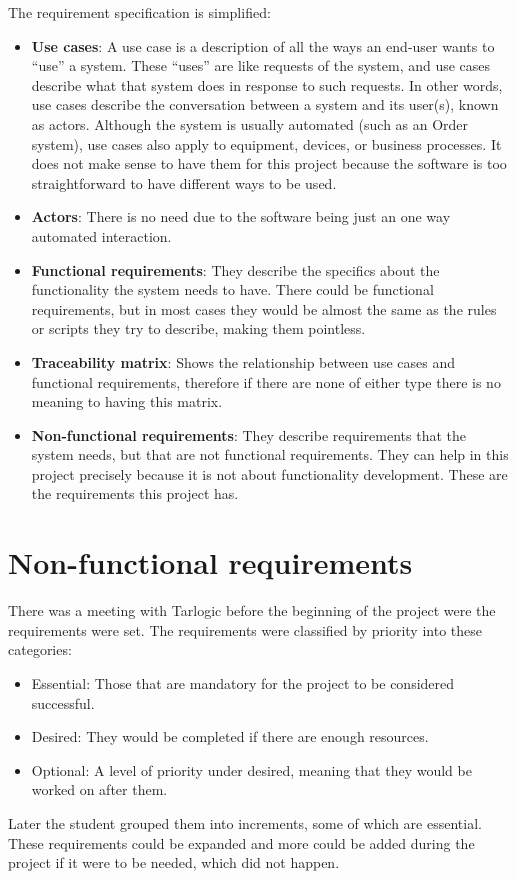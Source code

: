 \linej
\linej
The requirement specification is simplified:
\begin{itemize}
	\item \textbf{Use cases}: A use case is a description of all the ways an end-user wants to ``use'' a system. These ``uses'' are like requests of the system, and use cases describe what that system does in response to such requests. In other words, use cases describe the conversation between a system and its user(s), known as actors. Although the system is usually automated (such as an Order system), use cases also apply to equipment, devices, or business processes\cite{use_case_definition}. It does not make sense to have them for this project because the software is too straightforward to have different ways to be used.
	\item \textbf{Actors}: There is no need due to the software being just an one way automated interaction.
	\item \textbf{Functional requirements}: They describe the specifics about the functionality the system needs to have. There could be functional requirements, but in most cases they would be almost the same as the rules or scripts they try to describe, making them pointless.
	\item \textbf{Traceability matrix}: Shows the relationship between use cases and functional requirements, therefore if there are none of either type there is no meaning to having this matrix.
	\item \textbf{Non-functional requirements}: They describe requirements that the system needs, but that are not functional requirements. They can help in this project precisely because it is not about functionality development. These are the requirements this project has.
\end{itemize}

\section{Non-functional requirements}
There was a meeting with Tarlogic before the beginning of the project were the requirements were set.
The requirements were classified by priority into these categories:
\begin{itemize}
	\item Essential: Those that are mandatory for the project to be considered successful.
	\item Desired: They would be completed if there are enough resources.
	\item Optional: A level of priority under desired, meaning that they would be worked on after them.
\end{itemize}
\linej
Later the student grouped them into increments, some of which are essential.
\linej
\linej
These requirements could be expanded and more could be added during the project if it were to be needed, which did not happen.

